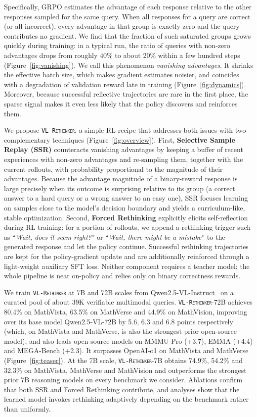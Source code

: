 \documentclass{article}
\newcommand{\model}{\texttt{\textsc{VL-Rethinker}}\xspace}
\begin{document}
Specifically, GRPO estimates the advantage of each response relative to the other responses sampled for the same query. When all responses for a query are correct (or all incorrect), every advantage in that group is exactly zero and the query contributes no gradient. We find that the fraction of such saturated groups grows quickly during training: in a typical run, the ratio of queries with non-zero advantages drops from roughly 40\% to about 20\% within a few hundred steps (Figure~\ref{fig:vanishing}). We call this phenomenon \emph{vanishing advantages}. It shrinks the effective batch size, which makes gradient estimates noisier, and coincides with a degradation of validation reward late in training (Figure~\ref{fig:dynamics}). Moreover, because successful reflective trajectories are rare in the first place, the sparse signal makes it even less likely that the policy discovers and reinforces them.


We propose \model, a simple RL recipe that addresses both issues with two complementary techniques (Figure~\ref{fig:overview}). First, \textbf{Selective Sample Replay (SSR)} counteracts vanishing advantages by keeping a buffer of recent experiences with non-zero advantages and re-sampling them, together with the current rollouts, with probability proportional to the magnitude of their advantages. Because the advantage magnitude of a binary-reward response is large precisely when its outcome is surprising relative to its group (a correct answer to a hard query or a wrong answer to an easy one), SSR focuses learning on samples close to the model's decision boundary and yields a curriculum-like, stable optimization. Second, \textbf{Forced Rethinking} explicitly elicits self-reflection during RL training: for a portion of rollouts, we append a rethinking trigger such as ``\emph{Wait, does it seem right?}'' or ``\emph{Wait, there might be a mistake}'' to the generated response and let the policy continue. Successful rethinking trajectories are kept for the policy-gradient update and are additionally reinforced through a light-weight auxiliary SFT loss. Neither component requires a teacher model; the whole pipeline is near on-policy and relies only on binary correctness rewards.

We train \model at 7B and 72B scales from Qwen2.5-VL-Instruct~\citep{qwen2_5_vl} on a curated pool of about 39K verifiable multimodal queries. \model-72B achieves 80.4\% on MathVista, 63.5\% on MathVerse and 44.9\% on MathVision, improving over its base model Qwen2.5-VL-72B by 5.6, 6.3 and 6.8 points respectively (which, on MathVista and MathVerse, is also the strongest prior open-source model), and also leads open-source models on MMMU-Pro (+3.7), EMMA (+4.4) and MEGA-Bench (+2.3). It surpasses OpenAI-o1 on MathVista and MathVerse (Figure~\ref{fig:teaser}). At the 7B scale, \model-7B obtains 74.9\%, 54.2\% and 32.3\% on MathVista, MathVerse and MathVision and outperforms the strongest prior 7B reasoning models on every benchmark we consider. Ablations confirm that both SSR and Forced Rethinking contribute, and analyses show that the learned model invokes rethinking adaptively depending on the benchmark rather than uniformly.
\end{document}
